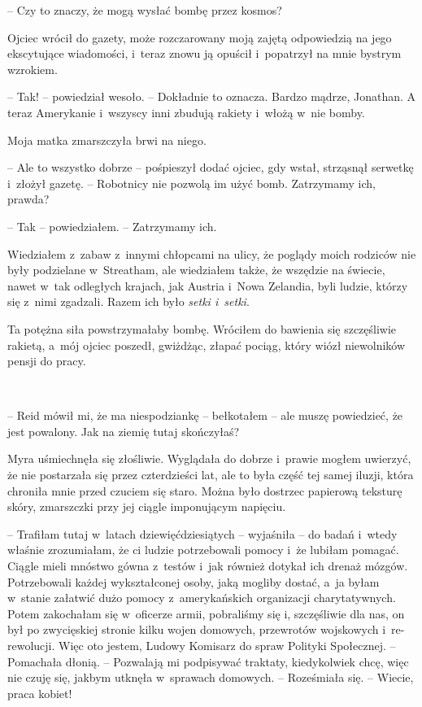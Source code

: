 \documentclass[oneside,polish,11pt,sfheadings]{mwbk}
\begin{document}
-- Czy to znaczy, że mogą wysłać bombę przez kosmos?

Ojciec wrócił do gazety, może rozczarowany moją zajętą odpowiedzią na
jego ekscytujące wiadomości, i~teraz znowu ją opuścił i~popatrzył na
mnie bystrym wzrokiem.

-- Tak! -- powiedział wesoło. -- Dokładnie to oznacza. Bardzo mądrze,
Jonathan. A teraz Amerykanie i~wszyscy inni zbudują rakiety i~włożą w~nie bomby.

Moja matka zmarszczyła brwi na niego.

-- Ale to wszystko dobrze -- pośpieszył dodać ojciec, gdy wstał, strząsnął serwetkę i~złożył gazetę. -- Robotnicy nie pozwolą im użyć
bomb. Zatrzymamy ich, prawda?

-- Tak -- powiedziałem. -- Zatrzymamy ich.

Wiedziałem z~zabaw z~innymi chłopcami na ulicy, że poglądy moich
rodziców nie były podzielane w~Streatham, ale wiedziałem także, że
wszędzie na świecie, nawet w~tak odległych krajach, jak Austria i~Nowa
Zelandia, byli ludzie, którzy się z~nimi zgadzali. Razem ich było
\emph{setki i~setki}.

Ta potężna siła powstrzymałaby bombę. Wróciłem do bawienia się
szczęśliwie rakietą, a~mój ojciec poszedł, gwiżdżąc, złapać pociąg, który
wiózł niewolników pensji do pracy.

~

-- Reid mówił mi, że ma niespodziankę -- bełkotałem -- ale muszę
powiedzieć, że jest powalony. Jak na ziemię tutaj skończyłaś?

Myra uśmiechnęła się złośliwie. Wyglądała do dobrze i~prawie mogłem
uwierzyć, że nie postarzała się przez czterdzieści lat, ale to była
część tej samej iluzji, która chroniła mnie przed czuciem się staro.
Można było dostrzec papierową teksturę skóry, zmarszczki przy jej ciągle
imponującym napięciu.

-- Trafiłam tutaj w~latach dziewięćdziesiątych -- wyjaśniła -- do badań i~wtedy właśnie zrozumiałam, że ci ludzie potrzebowali pomocy i~że lubiłam
pomagać. Ciągle mieli mnóstwo gówna z~testów i~jak również dotykał ich
drenaż mózgów. Potrzebowali każdej wykształconej osoby, jaką mogliby
dostać, a~ja byłam w~stanie załatwić dużo pomocy z~amerykańskich
organizacji charytatywnych. Potem zakochałam się w~oficerze armii,
pobraliśmy się i, szczęśliwie dla nas, on był po zwycięskiej stronie
kilku wojen domowych, przewrotów wojskowych i~re-rewolucji. Więc oto
jestem, Ludowy Komisarz do spraw Polityki Społecznej. -- Pomachała
dłonią. -- Pozwalają mi podpisywać traktaty, kiedykolwiek chcę, więc nie
czuję się, jakbym utknęła w~sprawach domowych. -- Roześmiała się. -- Wiecie, praca kobiet!
\end{document}
